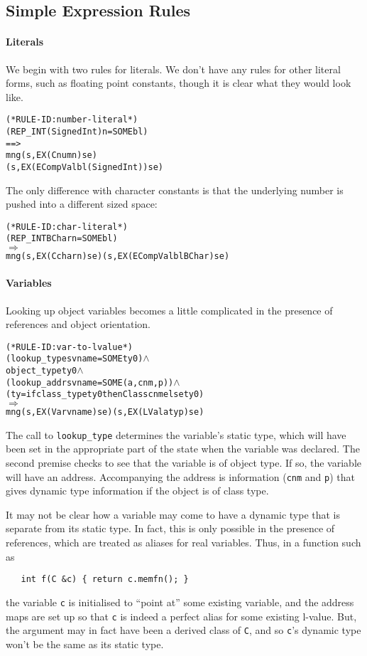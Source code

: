 \documentclass[11pt]{article}
\begin{document}
\subsection{Simple Expression Rules}
\label{sec:simple-expr-rules}

\paragraph{Literals} We begin with two rules for literals.  We don't
have any rules for other literal forms, such as floating point
constants, though it is clear what they would look like.
\begin{alltt}
(* RULE-ID: number-literal *)
     (REP_INT (Signed Int) n = SOME bl)
   ==>
     mng (s, EX (Cnum n) se) 
         (s, EX (ECompVal bl (Signed Int)) se)
\end{alltt}

The only difference with character constants is that the underlying
number is pushed into a different sized space:
\begin{alltt}
(* RULE-ID: char-literal *)
     (REP_INT BChar n = SOME bl)
   \(\Rightarrow\)
     mng (s, EX (Cchar n) se) (s, EX (ECompVal bl BChar) se)
\end{alltt}

\paragraph{Variables} Looking up object variables becomes a little
complicated in the presence of references and object orientation. 
\begin{alltt}
(* RULE-ID: var-to-lvalue *)
     (lookup_type s vname = SOME ty0) \(\land\)
     object_type ty0 \(\land\)
     (lookup_addr s vname = SOME (a,cnm,p)) \(\land\)
     (ty = if class_type ty0 then Class cnm else ty0)
   \(\Rightarrow\)
     mng (s, EX (Var vname) se) (s, EX (LVal a ty p) se)
\end{alltt}
The call to \texttt{lookup_type} determines the variable's static
type, which will have been set in the appropriate part of the state
when the variable was declared.  The second premise checks to see that
the variable is of object type.  If so, the variable will have an
address.  Accompanying the address is information (\texttt{cnm} and
\texttt{p}) that gives dynamic type information if the object is of
class type.  

It may not be clear how a variable may come to have a dynamic type
that is separate from its static type.  In fact, this is only possible
in the presence of references, which are treated as aliases for real
variables.  Thus, in a function such as 
\begin{verbatim}
   int f(C &c) { return c.memfn(); }
\end{verbatim}
the variable \texttt{c} is initialised to ``point at'' some existing
variable, and the address maps are set up so that \texttt{c} is indeed
a perfect alias for some existing l-value.  But, the argument may in
fact have been a derived class of \texttt{C}, and so \texttt{c}'s
dynamic type won't be the same as its static type.
\end{document}
